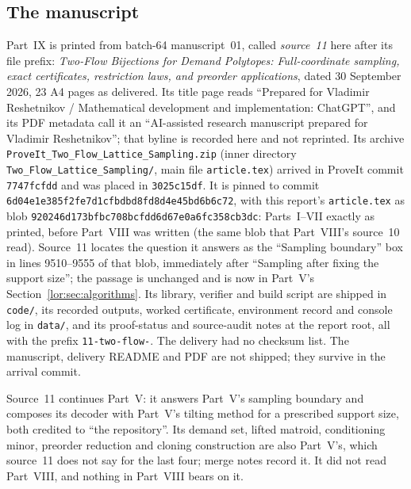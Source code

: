 \documentclass[11pt]{article}
\numberwithin{equation}{section}
\theoremstyle{definition}
\begin{document}
\subsection{The manuscript}
\label{tf:sec:source}
Part~IX is printed from batch-64 manuscript~01, called \emph{source~11}
here after its file prefix: \emph{Two-Flow Bijections for Demand
Polytopes: Full-coordinate sampling, exact certificates, restriction laws,
and preorder applications}, dated 30 September 2026, 23 A4 pages as
delivered. Its title page reads ``Prepared for Vladimir Reshetnikov /
Mathematical development and implementation: ChatGPT'', and its PDF
metadata call it an ``AI-assisted research manuscript prepared for
Vladimir Reshetnikov''; that byline is recorded here and not reprinted.
Its archive \nolinkurl{ProveIt_Two_Flow_Lattice_Sampling.zip} (inner
directory \nolinkurl{Two_Flow_Lattice_Sampling/}, main file
\nolinkurl{article.tex}) arrived in ProveIt commit \texttt{7747fcfdd} and
was placed in \texttt{3025c15df}. It is pinned to commit
\texttt{6d04e1e385f2fe7d1cfbdbd8fd8d4e45bd6b6c72}, with this report's
\texttt{article.tex} as blob
\texttt{920246d173bfbc708bcf\allowbreak dd6d67e0a6fc358cb3dc}: Parts~I--VII
exactly as printed, before Part~VIII was written (the same blob that
Part~VIII's source~10 read). Source~11 locates the question it answers as
the ``Sampling boundary'' box in lines 9510--9555 of that blob, immediately
after ``Sampling after fixing the support size''; the passage is unchanged
and is now in Part~V's Section~\ref{lor:sec:algorithms}. Its library,
verifier and build script are shipped in \nolinkurl{code/}, its recorded
outputs, worked certificate, environment record and console log in
\nolinkurl{data/}, and its proof-status and source-audit notes at the
report root, all with the prefix \texttt{11-two-flow-}. The delivery had
no checksum list. The manuscript, delivery README and PDF are not
shipped; they survive in the arrival commit.

Source~11 continues Part~V: it answers Part~V's sampling boundary and
composes its decoder with Part~V's tilting method for a prescribed
support size, both credited to ``the repository''. Its demand set, lifted
matroid, conditioning minor, preorder reduction and cloning construction
are also Part~V's, which source~11 does not say for the last four; merge
notes record it. It did not read Part~VIII, and nothing in Part~VIII bears
on it.
\end{document}

